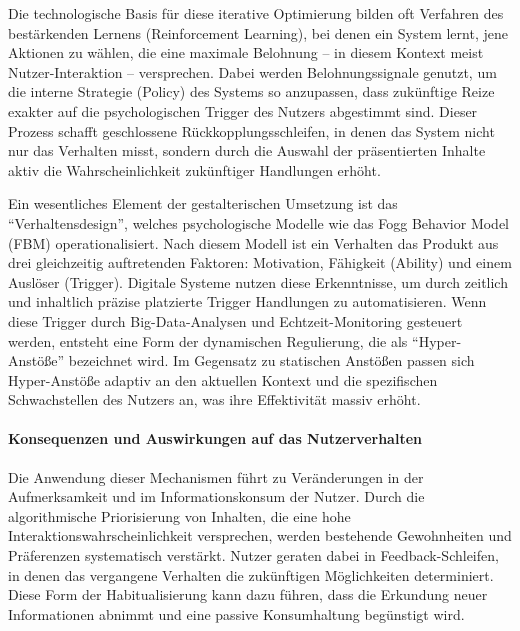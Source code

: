 Die technologische Basis für diese iterative Optimierung bilden oft Verfahren des bestärkenden Lernens (Reinforcement Learning), bei denen ein System lernt, jene Aktionen zu wählen, die eine maximale Belohnung -- in diesem Kontext meist Nutzer-Interaktion -- versprechen. Dabei werden Belohnungssignale genutzt, um die interne Strategie (Policy) des Systems so anzupassen, dass zukünftige Reize exakter auf die psychologischen Trigger des Nutzers abgestimmt sind. Dieser Prozess schafft geschlossene Rückkopplungsschleifen, in denen das System nicht nur das Verhalten misst, sondern durch die Auswahl der präsentierten Inhalte aktiv die Wahrscheinlichkeit zukünftiger Handlungen erhöht.

Ein wesentliches Element der gestalterischen Umsetzung ist das \enquote{Verhaltensdesign}, welches psychologische Modelle wie das Fogg Behavior Model (FBM) operationalisiert. Nach diesem Modell ist ein Verhalten das Produkt aus drei gleichzeitig auftretenden Faktoren: Motivation, Fähigkeit (Ability) und einem Auslöser (Trigger). Digitale Systeme nutzen diese Erkenntnisse, um durch zeitlich und inhaltlich präzise platzierte Trigger Handlungen zu automatisieren. Wenn diese Trigger durch Big-Data-Analysen und Echtzeit-Monitoring gesteuert werden, entsteht eine Form der dynamischen Regulierung, die als \enquote{Hyper-Anstöße} bezeichnet wird. Im Gegensatz zu statischen Anstößen passen sich Hyper-Anstöße adaptiv an den aktuellen Kontext und die spezifischen Schwachstellen des Nutzers an, was ihre Effektivität massiv erhöht.

\paragraph{Konsequenzen und Auswirkungen auf das Nutzerverhalten}

Die Anwendung dieser Mechanismen führt zu Veränderungen in der Aufmerksamkeit und im Informationskonsum der Nutzer. Durch die algorithmische Priorisierung von Inhalten, die eine hohe Interaktionswahrscheinlichkeit versprechen, werden bestehende Gewohnheiten und Präferenzen systematisch verstärkt. Nutzer geraten dabei in Feedback-Schleifen, in denen das vergangene Verhalten die zukünftigen Möglichkeiten determiniert. Diese Form der Habitualisierung kann dazu führen, dass die Erkundung neuer Informationen abnimmt und eine passive Konsumhaltung begünstigt wird.


